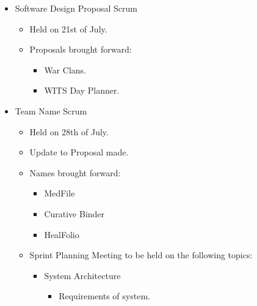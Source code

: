 \documentclass[a4paper]{article}
\begin{document}
\begin{itemize} 

\item Software Design Proposal Scrum

\begin{itemize}

\item Held on 21st of July.

\item Proposals brought forward:

\begin{itemize}

\item War Clans.

\item WITS Day Planner.

\end{itemize}

\end{itemize}

\item Team Name Scrum

\begin{itemize}

\item Held on 28th of July.

\item Update to Proposal made.

\item Names brought forward:

\begin{itemize}

\item MedFile

\item Curative Binder

\item HealFolio

\end{itemize}

\item Sprint Planning Meeting to be held on the following topics:

\begin{itemize}

\item System Architecture

\begin{itemize}

\item Requirements of system.


\end{itemize}
\end{itemize}
\end{itemize}
\end{itemize}
\end{document}
